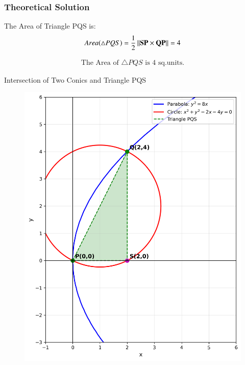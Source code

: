 \documentclass{beamer}
\begin{document}
\begin{frame}[fragile]
\frametitle{Theoretical Solution}
 The Area of Triangle PQS is:
\begin{equation}
    Area(\triangle PQS) = \dfrac{1}{2}\left\lVert\mathbf{SP} \times \mathbf{QP}\right\rVert = 4
\end{equation}

\begin{align*}
    \boxed{\text{The Area of $\triangle PQS$ is 4 sq.units.}}
\end{align*}   
\end{frame}


\begin{frame}{Intersection of Two Conics and Triangle PQS}
\begin{figure}
   \centering
    \includegraphics[width=\columnwidth, height=0.8\textheight, keepaspectratio]{figs/fig1.png}
    \label{fig:Beamer/figs/fig1.png}
\end{figure}
\end{frame}
\end{document}
